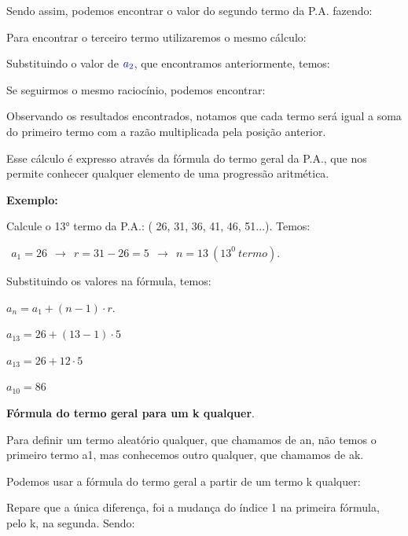 \begin{multicols*}{2}
Sendo assim, podemos encontrar o valor do segundo termo da P.A. fazendo:


Para encontrar o terceiro termo utilizaremos o mesmo cálculo:


Substituindo o valor de $\color{blue}a_2$, que encontramos anteriormente, temos:


Se seguirmos o mesmo raciocínio, podemos encontrar:



Observando os resultados encontrados, notamos que cada termo será igual a soma do primeiro termo com a razão multiplicada pela posição anterior.

Esse cálculo é expresso através da fórmula do termo geral da P.A., que nos permite conhecer qualquer elemento de uma progressão aritmética.	

\textbf{Exemplo:}

	Calcule o 13° termo da P.A.: ( 26, 31, 36, 41, 46, 51...). Temos:
	
	\color{blue}$ \ \ a_1 = 26 \ \ \to \ \ r = 31 - 26 = 5 \ \ \to \ \ n = 13 \ (13^0 \ termo)$.
	
	\color{black}Substituindo os valores na fórmula, temos:
	
	\color{blue}$ a_n = a_1 + (n - 1) \cdot r $.
	
	$ a_{13} = 26 + (13 - 1) \cdot 5 $
	
	$ a_{13} = 26 + 12 \cdot 5 $
	
	$ a_{10} = 86 $\color{black}
	
	\textbf{Fórmula do termo geral para um k qualquer}.
	
	Para definir um termo aleatório qualquer, que chamamos de an, não temos o primeiro termo a1, mas conhecemos outro qualquer, que chamamos de ak.

Podemos usar a fórmula do termo geral a partir de um termo k qualquer:


Repare que a única diferença, foi a mudança do índice 1 na primeira fórmula, pelo k, na segunda. Sendo:


\end{multicols*}
